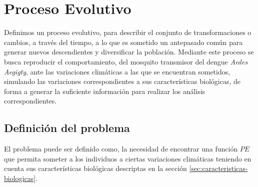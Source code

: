 \section{Proceso Evolutivo}

Definimos un proceso evolutivo, para describir el conjunto de transformaciones o cambios, a través del tiempo, 
a lo que es sometido un antepasado común para generar nuevos descendientes y diversificar la población. Mediante 
este proceso se  busca reproducir el comportamiento, del mosquito transmisor del dengue \textit{Aedes Aegigty},
ante las variaciones climáticas a las que se encuentran sometidos, simulando las variaciones correspondientes a 
sus características biológicas, de forma a generar la suficiente información para realizar los análisis
correspondientes.

\subsection{Definición del problema}

El problema puede ser definido como, la necesidad de encontrar una función $PE$ que permita someter a los
individuos a ciertas variaciones climáticas teniendo en cuenta sus características biológicas descriptas en la 
sección \ref{sec:caracteristicas-biologicas}.

